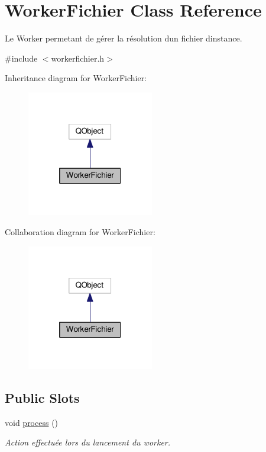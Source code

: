 \hypertarget{classWorkerFichier}{}\section{Worker\+Fichier Class Reference}
\label{classWorkerFichier}


Le Worker permetant de gérer la résolution d\textquotesingle{}un fichier d\textquotesingle{}instance.  




{\ttfamily \#include $<$workerfichier.\+h$>$}



Inheritance diagram for Worker\+Fichier\+:\nopagebreak
\begin{figure}[H]
\begin{center}
\leavevmode
\includegraphics[width=157pt]{classWorkerFichier__inherit__graph}
\end{center}
\end{figure}


Collaboration diagram for Worker\+Fichier\+:\nopagebreak
\begin{figure}[H]
\begin{center}
\leavevmode
\includegraphics[width=157pt]{classWorkerFichier__coll__graph}
\end{center}
\end{figure}
\subsection*{Public Slots}
\begin{DoxyCompactItemize}
\item 
void \hyperlink{classWorkerFichier_a3b72efa3a7e2de6f1a8001d999731e11}{process} ()
\begin{DoxyCompactList}\small\item\em Action effectuée lors du lancement du worker. \end{DoxyCompactList}\end{DoxyCompactItemize}

